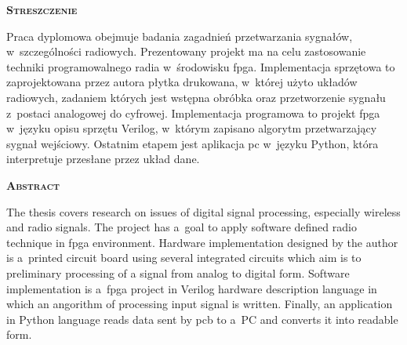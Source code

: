 \newpage
\thispagestyle{empty}

\vspace*{1.5cm}
{	
	\LARGE
	\textsc{\textbf{Streszczenie}}
}
\vspace*{0.5cm}

Praca dyplomowa obejmuje badania zagadnień przetwarzania sygnałów,
w~szczególności radiowych. Prezentowany projekt ma na celu zastosowanie
techniki programowalnego radia w~środowisku \gls{fpga}. Implementacja sprzętowa
to zaprojektowana przez autora płytka drukowana, w~której użyto układów
radiowych, zadaniem których jest wstępna obróbka oraz przetworzenie sygnału
z~postaci analogowej do cyfrowej. Implementacja programowa to projekt \gls{fpga}
w~języku opisu sprzętu Verilog, w~którym zapisano algorytm przetwarzający
sygnał wejściowy. Ostatnim etapem jest aplikacja \gls{pc} w~języku Python, która
interpretuje przesłane przez układ dane.

\vspace*{1.5cm}
{
	\LARGE
	\textsc{\textbf{Abstract}}
}
\vspace*{0.5cm}

The thesis covers research on issues of digital signal processing, especially
wireless and radio signals. The project has a~goal to apply software defined
radio technique in \gls{fpga} environment. Hardware implementation designed by
the author is a~printed circuit board using several integrated circuits
which aim is to preliminary processing of a signal from analog to digital form.
Software implementation is a~\gls{fpga} project in Verilog hardware description
language in which an angorithm of processing input signal is written. Finally,
an application in Python language reads data sent by \gls{pcb} to a~PC and
converts it into readable form.
